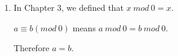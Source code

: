 \documentclass[12pt,a4paper]{article}
\makeatletter
\newtheorem*{solution}{Solution}
\theoremstyle{definition}
\renewenvironment{solution}[1][Solution] {\par\pushQED{\qed}\normalfont\topsep6\p@\@plus6\p@\relax\trivlist\item[\hskip\labelsep\bfseries#1\@addpunct{.}]\ignorespaces}{\popQED\endtrivlist\@endpefalse} \makeatother
\makeatother
\begin{document}
\begin{enumerate}
\begin{solution}
        	In Chapter 3, we defined that $x\ mod\ 0=x$.
        	
        	$a\equiv b(mod\ 0)$ means $a\ mod\ 0=b\ mod\ 0 $.
        	
        	Therefore $a=b$.
        \end{solution}
       
        
\end{enumerate}

\end{document}

